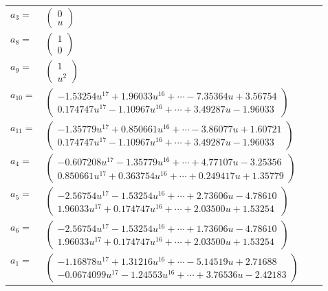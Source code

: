 \documentclass[1p]{elsarticle_modified}
\theoremstyle{definition}
\begin{document}
\begin{tabular}{m{7pt} m{180pt} m{7pt} m{180pt} }
\flushright $a_{3}=$&$\begin{pmatrix}0\\u\end{pmatrix}$ \\
\flushright $a_{8}=$&$\begin{pmatrix}1\\0\end{pmatrix}$ \\
\flushright $a_{9}=$&$\begin{pmatrix}1\\u^2\end{pmatrix}$ \\
\flushright $a_{10}=$&$\begin{pmatrix}-1.53254 u^{17}+1.96033 u^{16}+\cdots-7.35364 u+3.56754\\0.174747 u^{17}-1.10967 u^{16}+\cdots+3.49287 u-1.96033\end{pmatrix}$ \\
\flushright $a_{11}=$&$\begin{pmatrix}-1.35779 u^{17}+0.850661 u^{16}+\cdots-3.86077 u+1.60721\\0.174747 u^{17}-1.10967 u^{16}+\cdots+3.49287 u-1.96033\end{pmatrix}$ \\
\flushright $a_{4}=$&$\begin{pmatrix}-0.607208 u^{17}-1.35779 u^{16}+\cdots+4.77107 u-3.25356\\0.850661 u^{17}+0.363754 u^{16}+\cdots+0.249417 u+1.35779\end{pmatrix}$ \\
\flushright $a_{5}=$&$\begin{pmatrix}-2.56754 u^{17}-1.53254 u^{16}+\cdots+2.73606 u-4.78610\\1.96033 u^{17}+0.174747 u^{16}+\cdots+2.03500 u+1.53254\end{pmatrix}$ \\
\flushright $a_{6}=$&$\begin{pmatrix}-2.56754 u^{17}-1.53254 u^{16}+\cdots+1.73606 u-4.78610\\1.96033 u^{17}+0.174747 u^{16}+\cdots+2.03500 u+1.53254\end{pmatrix}$ \\
\flushright $a_{1}=$&$\begin{pmatrix}-1.16878 u^{17}+1.31216 u^{16}+\cdots-5.14519 u+2.71688\\-0.0674099 u^{17}-1.24553 u^{16}+\cdots+3.76536 u-2.42183\end{pmatrix}$ \\

\end{tabular}
\end{document}
